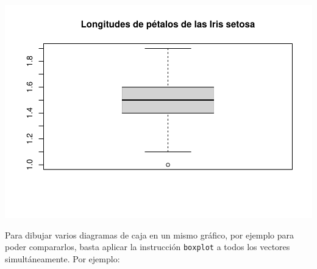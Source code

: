 \documentclass[
]{book}
\theoremstyle{definition}
\theoremstyle{definition}
\theoremstyle{definition}
\theoremstyle{remark}
\begin{document}
\begin{center}\includegraphics[width=0.9\linewidth]{12chap12_Descripcion_cuantitativos_files/figure-latex/unnamed-chunk-42-1} \end{center}

Para dibujar varios diagramas de caja en un mismo gráfico, por ejemplo para poder compararlos, basta aplicar la instrucción \texttt{boxplot} a todos los vectores simultáneamente. Por ejemplo:
\end{document}
